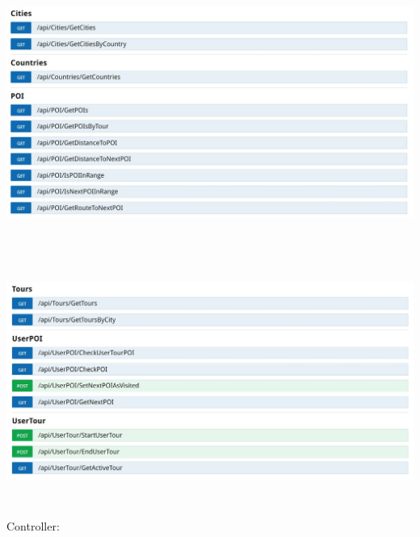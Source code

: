 \documentclass[a4paper,10pt,xetex]{article}
\begin{document}
\bigskip

\includegraphics[width=6.5in,height=3.4165in]{swagger1.jpg}

\includegraphics[width=6.4862in,height=3.139in]{swagger2.jpg}


\bigskip

  Controller:

\tabulinesep=1.2mm
\end{document}
